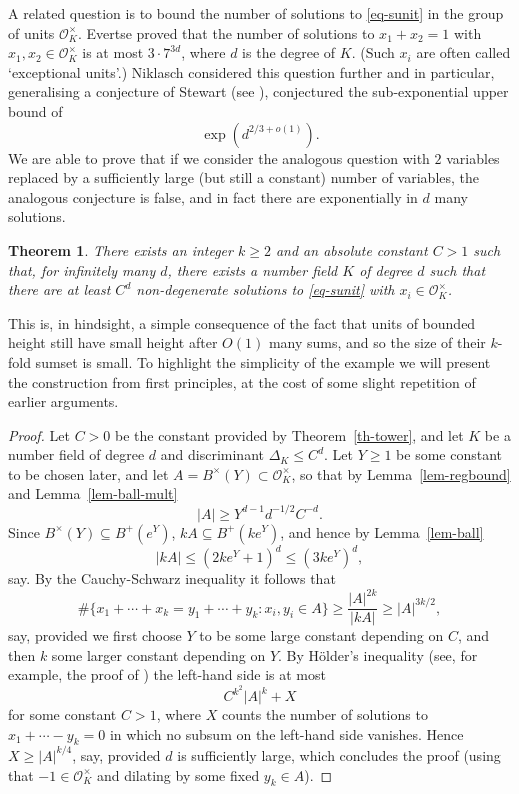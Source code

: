 \documentclass{amsart}
\numberwithin{equation}{section}
\newcommand{\abs}[1]{\mathopen{}\left| #1\mathclose{}\right|}
\newtheorem{theorem}{Theorem}[section]
\begin{document}
A related question is to bound the number of solutions to \eqref{eq-sunit} in the group of units $\mathcal{O}_K^\times$. Evertse \cite{Ev83} proved that the number of solutions to $x_1+x_2=1$ with $x_1,x_2\in \mathcal{O}_K^\times$ is at most $3\cdot 7^{3d}$, where $d$ is the degree of $K$. (Such $x_i$ are often called `exceptional units'.) Niklasch \cite{Ni97} considered this question further and in particular, generalising a conjecture of Stewart (see \cite[p.120]{EGST88}), conjectured \cite[Conjecture 4.2]{Ni97} the sub-exponential upper bound of
\[\exp(d^{2/3+o(1)}).\]
We are able to prove that if we consider the analogous question with $2$ variables replaced by a sufficiently large (but still a constant) number of variables, the analogous conjecture is false, and in fact there are exponentially in $d$ many solutions.
\begin{theorem}\label{th-unitlower-body}
There exists an integer $k\geq 2$ and an absolute constant $C>1$ such that, for infinitely many $d$, there exists a number field $K$ of degree $d$ such that there are at least $C^d$ non-degenerate solutions to \eqref{eq-sunit} with $x_i\in \mathcal{O}_K^\times$.
\end{theorem}
This is, in hindsight, a simple consequence of the fact that units of bounded height still have small height after $O(1)$ many sums, and so the size of their $k$-fold sumset is small. To highlight the simplicity of the example we will present the construction from first principles, at the cost of some slight repetition of earlier arguments.
\begin{proof}
Let $C>0$ be the constant provided by Theorem~\ref{th-tower}, and let $K$ be a number field of degree $d$ and discriminant $\Delta_K\leq C^d$. Let $Y\geq 1$ be some constant to be chosen later, and let $A=B^\times(Y)\subset \mathcal{O}_K^\times$, so that by Lemma~\ref{lem-regbound} and Lemma~\ref{lem-ball-mult}
\[\abs{A}\geq Y^{d-1}d^{-1/2}C^{-d}.\]
Since $B^\times(Y)\subseteq B^+(e^Y)$, $kA\subseteq B^+(ke^Y)$, and hence by Lemma~\ref{lem-ball}
\[\abs{kA}\leq (2ke^Y+1)^d\leq (3ke^Y)^d,\]
say. By the Cauchy-Schwarz inequality it follows that 
\[\#\{x_1+\cdots+x_k=y_1+\cdots+y_k : x_i,y_i\in A\}\geq \frac{\abs{A}^{2k}}{\abs{kA}}\geq \abs{A}^{3k/2},\]
say, provided we first choose $Y$ to be some large constant depending on $C$, and then $k$ some larger constant depending on $Y$. By H\"{o}lder's inequality (see, for example, the proof of \cite[Lemma 5]{ABP25}) the left-hand side is at most
\[C^{k^2}\abs{A}^k+X\]
for some constant $C>1$, where $X$ counts the number of solutions to $x_1+\cdots-y_k=0$ in which no subsum on the left-hand side vanishes. Hence $X\geq \abs{A}^{k/4}$, say, provided $d$ is sufficiently large, which concludes the proof (using that $-1\in \mathcal{O}_K^\times$ and dilating by some fixed $y_k\in A$).
\end{proof}
\end{document}
